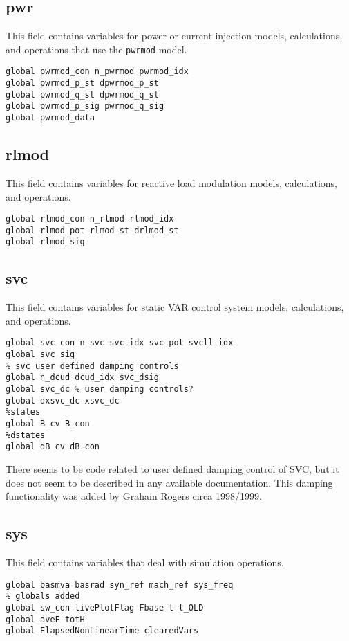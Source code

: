 \subsection{pwr}
This field contains variables for power or current injection models, calculations, and operations that use the \verb|pwrmod| model.
\begin{verbatim}
global pwrmod_con n_pwrmod pwrmod_idx
global pwrmod_p_st dpwrmod_p_st
global pwrmod_q_st dpwrmod_q_st
global pwrmod_p_sig pwrmod_q_sig
global pwrmod_data
\end{verbatim}


\subsection{rlmod}
This field contains variables for reactive load modulation models, calculations, and operations.
\begin{verbatim}
global rlmod_con n_rlmod rlmod_idx
global rlmod_pot rlmod_st drlmod_st
global rlmod_sig
\end{verbatim}

\subsection{svc}
This field contains variables for static VAR control system models, calculations, and operations.
\begin{verbatim}
global svc_con n_svc svc_idx svc_pot svcll_idx
global svc_sig
% svc user defined damping controls
global n_dcud dcud_idx svc_dsig
global svc_dc % user damping controls?
global dxsvc_dc xsvc_dc
%states
global B_cv B_con
%dstates
global dB_cv dB_con
\end{verbatim}

There seems to be code related to user defined damping control of SVC, but it does not seem to be described in any available documentation. 
This damping functionality was added by Graham Rogers circa 1998/1999.


\subsection{sys}
This field contains variables that deal with simulation operations.
\begin{verbatim}
global basmva basrad syn_ref mach_ref sys_freq
% globals added
global sw_con livePlotFlag Fbase t t_OLD
global aveF totH
global ElapsedNonLinearTime clearedVars
\end{verbatim}


